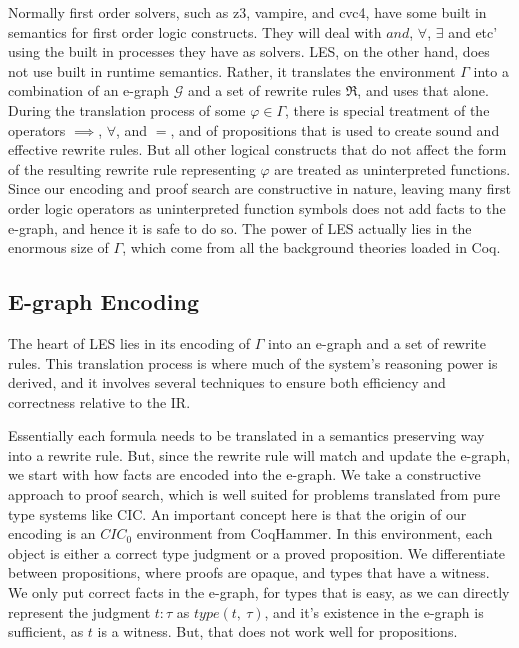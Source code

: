 Normally first order solvers, such as z3, vampire, and cvc4, have some built in semantics for first order logic constructs.
They will deal with $and$, $\forall$, $\exists$ and etc' using the built in processes they have as solvers.
LES, on the other hand, does not use built in runtime semantics. Rather, it translates the environment $\Gamma$ into a combination of an e-graph $\mathcal{G}$ and a set of rewrite rules $\Re$, and uses that alone.
During the translation process of some $\varphi \in \Gamma$, there is special treatment of the operators $\implies$, $\forall$, and $=$, and of propositions that is used to create sound and effective rewrite rules.
But all other logical constructs that do not affect the form of the resulting rewrite rule representing $\varphi$ are treated as uninterpreted functions.
Since our encoding and proof search are constructive in nature, leaving many first order logic operators as uninterpreted function symbols does not add facts to the e-graph, and hence it is safe to do so.
The power of LES actually lies in the enormous size of $\Gamma$, which come from all the background theories loaded in Coq.

\subsection{E-graph Encoding}
\label{translation:les:encoding}

The heart of LES lies in its encoding of $\Gamma$ into an e-graph and a set of rewrite rules.
This translation process is where much of the system's reasoning power is derived, and it involves several techniques to ensure both efficiency and correctness relative to the IR.

Essentially each formula needs to be translated in a semantics preserving way into a rewrite rule.
But, since the rewrite rule will match and update the e-graph, we start with how facts are encoded into the e-graph.
We take a constructive approach to proof search, which is well suited for problems translated from pure type systems like CIC.
An important concept here is that the origin of our encoding is an $CIC_0$ environment from CoqHammer.
In this environment, each object is either a correct type judgment or a proved proposition.
We differentiate between propositions, where proofs are opaque, and types that have a witness.
We only put correct facts in the e-graph, for types that is easy, as we can directly represent the judgment $t: \tau$ as $type(t,~\tau)$, and it's existence in the e-graph is sufficient, as $t$ is a witness.
But, that does not work well for propositions. 

